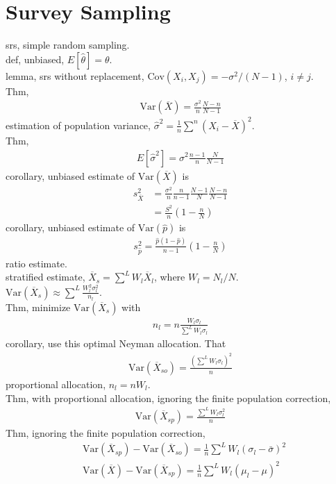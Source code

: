 \documentclass[paper=a4, fontsize=11pt]{scrartcl} %
\numberwithin{equation}{section} %
\numberwithin{figure}{section} %
\numberwithin{table}{section} %
\def \cov {\text{Cov}}
\def \var {\text{Var}}
\begin{document}
\section{Survey Sampling}
srs, simple random sampling.\\
def, unbiased, $E[\widehat{\theta}]=\theta$.\\
lemma, srs without replacement, $\cov(X_i,X_j)=-\sigma^2/(N-1)$, $i\neq j$.\\
Thm,
\begin{align}
	\var(\overline{X}) = \frac{\sigma^2}{n}\frac{N-n}{N-1}
\end{align}
estimation of population variance, $\widehat{\sigma}^2 = \frac{1}{n}\sum^n(X_i-\overline{X})^2$.\\
Thm,
\begin{align}
	E[\widehat{\sigma}^2] = \sigma^2 \frac{n-1}{n}\frac{N}{N-1}
\end{align}
corollary, unbiased estimate of $\var(\overline{X})$ is
\begin{align}
	s_{\overline{X}}^2 &= \frac{\sigma^2}{n}\frac{n}{n-1}\frac{N-1}{N}\frac{N-n}{N-1}\\
		&=\frac{S^2}{n}(1-\frac{n}{N})
\end{align}
corollary, unbiased estimate of $\var(\widehat{p})$ is
\begin{align}
	s_{\widehat{p}}^2 = \frac{\widehat{p}(1-\widehat{p})}{n-1}(1-\frac{n}{N})
\end{align}
ratio estimate.\\
stratified estimate, $\overline{X}_s = \sum^L W_l \overline{X}_l$, where $W_l=N_l/N$.\\
$\var(\overline{X}_s)\approx \sum^L \frac{W_l^2 \sigma_l^2}{n_l}$.\\
Thm, minimize $\var(\overline{X}_s)$ with 
\begin{align}
	n_l = n \frac{W_l\sigma_l}{\sum^L W_l\sigma_l}	
\end{align}
corollary, use this optimal Neyman allocation. That
\begin{align}
	\var(\overline{X}_{so}) = \frac{(\sum^L W_l\sigma_l)^2}{n}
\end{align}
proportional allocation, $n_l = nW_l$.\\
Thm, with proportional allocation, ignoring the finite population correction,
\begin{align}
	\var(\overline{X}_{sp}) = \frac{\sum^L W_l\sigma_l^2}{n}
\end{align}
Thm, ignoring the finite population correction,
\begin{align}
	&\var(\overline{X}_{sp}) - \var(\overline{X}_{so}) = \frac{1}{n}\sum^L W_l(\sigma_l -\bar{\sigma})^2 \\
	&\var(\overline{X}) - \var(\overline{X}_{sp}) = \frac{1}{n}\sum^L W_l(\mu_l -\mu)^2
\end{align}
\end{document}
